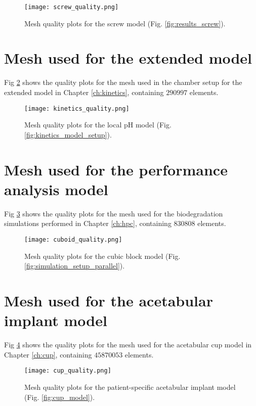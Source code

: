 \begin{figure}[!h]
\centering
\medskip
\texttt{[image: screw\_quality.png]}
\caption[Mesh quality plots for the screw model]{Mesh quality plots for the screw model (Fig. \ref{fig:results_screw}).} \label{fig:appendix_screw}
\end{figure}


\section{Mesh used for the extended model}

Fig \ref{fig:appendix_kinetics} shows the quality plots for the mesh used in the chamber setup for the extended model in Chapter \ref{ch:kinetics}, containing $\num{290997}$ elements.

\begin{figure}[!h]
\centering
\medskip
\texttt{[image: kinetics\_quality.png]}
\caption[Mesh quality plots for the local pH model]{Mesh quality plots for the local pH model (Fig. \ref{fig:kinetics_model_setup}).} \label{fig:appendix_kinetics}
\end{figure}

\section{Mesh used for the performance analysis model}

Fig \ref{fig:appendix_cuboid} shows the quality plots for the mesh used for the biodegradation simulations performed in Chapter \ref{ch:hpc}, containing $\num{830808}$ elements.

\begin{figure}[!h]
\centering
\medskip
\texttt{[image: cuboid\_quality.png]}
\caption[Mesh quality plots for the cubic block model]{Mesh quality plots for the cubic block model (Fig. \ref{fig:simulation_setup_parallel}).} \label{fig:appendix_cuboid}
\end{figure}

\section{Mesh used for the acetabular implant model}

Fig \ref{fig:appendix_cup} shows the quality plots for the mesh used for the acetabular cup model in Chapter \ref{ch:cup}, containing $\num{45870053}$ elements.

\begin{figure}[!h]
\centering
\medskip
\texttt{[image: cup\_quality.png]}
\caption[Mesh quality plots for the patient-specific acetabular implant model]{Mesh quality plots for the patient-specific acetabular implant model (Fig. \ref{fig:cup_model}).} \label{fig:appendix_cup}
\end{figure}

